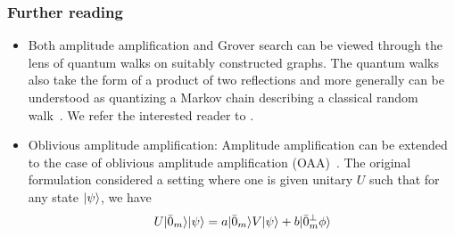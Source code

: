 \begin{refsection}

\subsubsection*{Further reading}

\begin{itemize}
    \item Both amplitude amplification and Grover search can be viewed through the lens of quantum walks on suitably constructed graphs. The quantum walks also take the form of a product of two reflections and more generally can be understood as quantizing a Markov chain describing a classical random walk~\cite{szegedy2004QMarkovChainSearch}. We refer the interested reader to \cite{childs2021LectureNotes, magniez2006SearchQuantumWalk,apers2019UnifiedFrameworkQWSearch,gilyen2014MScThesis}.
    \item Oblivious amplitude amplification: Amplitude amplification can be extended to the case of oblivious amplitude amplification (OAA)~\cite{berry2013ExpPrecHamSimSTOC}. The original formulation considered a setting where one is given unitary $U$ such that for any state $\lvert\psi\rangle$, we have 
    \begin{align}
    U \lvert\bar{0}_m\rangle \lvert\psi\rangle = a \lvert\bar{0}_m\rangle V \lvert\psi\rangle + b \lvert\bar{0}_m^\perp \phi\rangle    
    \end{align}

\end{itemize}
\end{refsection}
